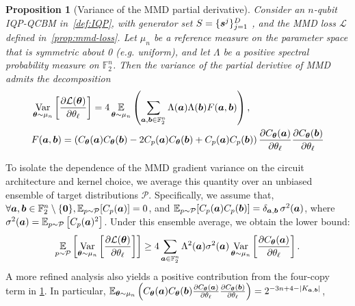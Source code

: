 \documentclass{article}
\theoremstyle{plain}
\newtheorem{proposition}[theorem]{Proposition}
\theoremstyle{definition}
\theoremstyle{remark}
\begin{document}
\begin{proposition}[Variance of the MMD partial derivative]
\label{prop:lower}
Consider an $n$-qubit IQP-QCBM in~\cref{def:IQP}, with generator set $S=\{{\bm{s}^j}\}_{j=1}^D$ , and the MMD loss $\mathcal{L}$ defined in~\cref{prop:mmd-loss}. Let $\mu_n$ be a reference measure on the parameter space that is symmetric about 0 (e.g. uniform), and let $\Lambda$ be a positive spectral probability measure on $\mathbb{F}_2^n$. Then the variance of the partial derivtive of MMD admits the decomposition
\begin{align}
&\operatorname*{Var}_{{\bm{\theta}}\sim \mu_n} \left[ \frac{\partial \mathcal{L}({\bm{\theta}})}{\partial \theta_\ell} \right]
= 4 \operatorname*{\mathbb{E}}_{{\bm{\theta}}\sim \mu_n} \left( \sum_{{\bm{a}}, {\bm{b}} \in \mathbb{F}_2^n} \Lambda({\bm{a}}) \Lambda({\bm{b}})F({\bm{a}}, {\bm{b}})\right), \label{eq: decomposition} \\
&F({\bm{a}}, {\bm{b}}) = \left( C_{\bm{\theta}}({\bm{a}}) C_{\bm{\theta}}({\bm{b}}) - 2C_p({\bm{a}}) C_{\bm{\theta}}({\bm{b}}) + C_p({\bm{a}}) C_p({\bm{b}}) \right)\frac{\partial C_{\bm{\theta}}({\bm{a}})}{\partial \theta_\ell} \frac{\partial C_{\bm{\theta}}({\bm{b}})}{\partial \theta_\ell} \nonumber
\end{align}
\end{proposition}
To isolate the dependence of the MMD gradient variance on the circuit architecture and kernel choice, we average this quantity over an unbiased ensemble of target distributions $\mathcal P$. Specifically, we assume that, $\forall{\bm{a}}, {\bm{b}} \in \mathbb{F}_2^n \setminus \{\bm{0}\},\operatorname*{\mathbb {E}}_{p\sim\mathcal {P}}[C_p({\bm{a}})]=0$, and $\operatorname*{\mathbb {E}}_{p\sim\mathcal {P}}\!\left[C_p({\bm{a}})C_p({\bm{b}})\right]=\delta_{{\bm{a}},{\bm{b}}}\,\sigma^2({\bm{a}})$, where $\sigma^2({\bm{a}}) = \operatorname*{\mathbb {E}}_{p \sim \mathcal{P}}\left[C_p({\bm{a}})^2\right]$. Under this ensemble average, we obtain the lower bound:
\begin{equation}
\operatorname*{\mathbb{E}}_{p\sim\mathcal{P}} \left[\operatorname*{Var}_{{\bm{\theta}}\sim\mu_n}  
\left[\frac{\partial \mathcal{L}({\bm{\theta}})}{\partial \theta_\ell} \right]\right] \geq
4 \sum_{{\bm{a}}\in \mathbb{F}_2^n} \Lambda^2({\bm{a}})\sigma^2({\bm{a}})\operatorname*{Var}_{{\bm{\theta}}\sim\mu_n} \left[ \frac{\partial C_{\bm{\theta}}({\bm{a}})}{\partial \theta_\ell} \right].
\label{eq: lower bound}
\end{equation}
A more refined analysis also yields a positive contribution from the four-copy term in \cref{prop:lower}. In particular, $\operatorname*{\mathbb{E}}_{{\bm{\theta}}\sim\mu_n}\left(C_{\bm{\theta}}({\bm{a}}) C_{\bm{\theta}}({\bm{b}}) \frac{\partial C_{\bm{\theta}}({\bm{a}})}{\partial \theta_\ell} \frac{\partial C_{\bm{\theta}}({\bm{b}})}{\partial \theta_\ell}\right)=2^{-3n+4-\abs{K_{{\bm{a}},{\bm{b}}}}}$,
\end{document}
